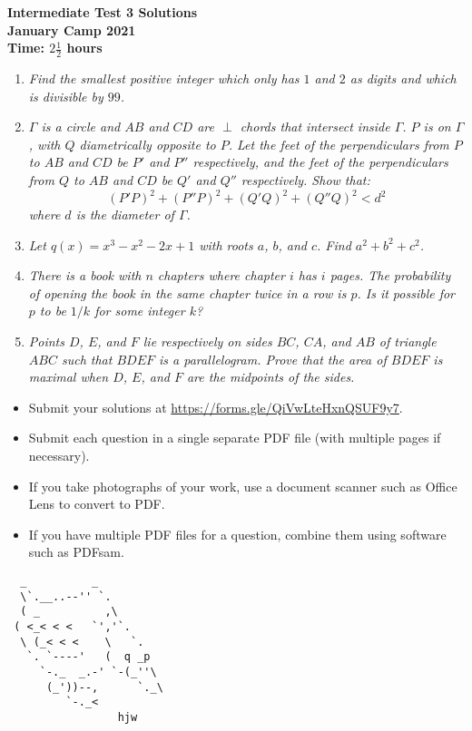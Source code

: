 \documentclass{article}
\begin{document}
\thispagestyle{empty}

\begin{center}
  \textbf{\Large Intermediate Test 3 Solutions}
  \\ \vspace{1em}
  \textbf{\large January Camp 2021}
  \\ \vspace{1em}
  \textbf{\large Time: $2\frac{1}{2}$ hours}
\end{center}

\vspace{24pt}

\begin{enumerate}[1.]

\item %
{\itshape Find the smallest positive integer which only has $1$ and $2$ as digits and which is divisible by $99$.}


\item %
{\itshape ${\Gamma}$ is a circle and ${AB}$ and ${CD}$ are ${\perp}$ chords that intersect inside ${\Gamma}$. ${P}$ is on ${\Gamma}$, with ${Q}$ diametrically opposite to ${P}$. Let the feet of the perpendiculars from ${P}$ to ${AB}$ and ${CD}$ be ${P'}$ and ${P''}$ respectively, and the feet of the perpendiculars from ${Q}$ to ${AB}$ and ${CD}$ be ${Q'}$ and ${Q''}$ respectively. Show that: $${ (P'P)^2+(P''P)^2+(Q'Q)^2+(Q''Q)^2 < d^2}$$ where ${d}$ is the diameter of ${\Gamma}$.}

\item %
{\itshape Let $q(x) = x^3 -x^2 -2x +1$ with roots $a$, $b$, and $c$.
Find $a^2 +b^2 + c^2$.}


\item %
{\itshape There is a book with $n$ chapters where chapter $i$ has $i$ pages.
The probability of opening the book in the same chapter twice in a row is $p$.
Is it possible for $p$ to be $1/k$ for some integer $k$?}


\item %
{\itshape Points $D$, $E$, and $F$ lie respectively on sides $BC$, $CA$, and $AB$ of triangle $ABC$ such that $BDEF$ is a parallelogram. Prove that the area of $BDEF$ is maximal when $D$, $E$, and $F$ are the midpoints of the sides.}


\end{enumerate}


\vfill
\begin{itemize}
	\item Submit your solutions at \url{https://forms.gle/QiVwLteHxnQSUF9y7}.
	\item Submit each question in a single separate PDF file (with multiple pages if necessary).
	\item If you take photographs of your work, use a document scanner such as Office Lens to convert to PDF.
	\item If you have multiple PDF files for a question, combine them using software such as PDFsam.
\end{itemize}

\vfill
\centering
\begin{BVerbatim}
  _          _
  \`.__..--'' `.
  ( _          ,\
 ( <_< < <   `','`.
  \ (_< < <    \   `.
   `. `----'   (  q _p
     `-._  _.-' `-(_''\
      (_'))--,      `._\
         `-._<
                 hjw
\end{BVerbatim}
\end{document}
